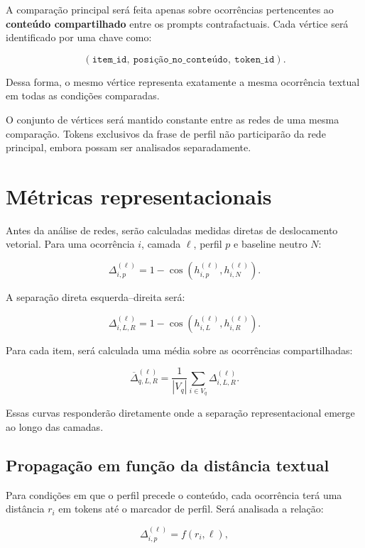 \documentclass[11pt,a4paper]{article}
\newcommand{\hstate}[3]{h_{#1,#2}^{(#3)}}
\begin{document}
A comparação principal será feita apenas sobre ocorrências pertencentes ao \textbf{conteúdo compartilhado} entre os prompts contrafactuais. Cada vértice será identificado por uma chave como:

\[
(\texttt{item\_id},\ \texttt{posição\_no\_conteúdo},\ \texttt{token\_id}).
\]

Dessa forma, o mesmo vértice representa exatamente a mesma ocorrência textual em todas as condições comparadas.

O conjunto de vértices será mantido constante entre as redes de uma mesma comparação. Tokens exclusivos da frase de perfil não participarão da rede principal, embora possam ser analisados separadamente.

\section{Métricas representacionais}

Antes da análise de redes, serão calculadas medidas diretas de deslocamento vetorial. Para uma ocorrência $i$, camada $\ell$, perfil $p$ e baseline neutro $N$:

\[
\Delta_{i,p}^{(\ell)}
=
1-\cos\left(
\hstate{i}{p}{\ell},
\hstate{i}{N}{\ell}
\right).
\]

A separação direta esquerda--direita será:

\[
\Delta_{i,L,R}^{(\ell)}
=
1-\cos\left(
\hstate{i}{L}{\ell},
\hstate{i}{R}{\ell}
\right).
\]

Para cada item, será calculada uma média sobre as ocorrências compartilhadas:

\[
\overline{\Delta}_{q,L,R}^{(\ell)}
=
\frac{1}{|V_q|}
\sum_{i \in V_q}
\Delta_{i,L,R}^{(\ell)}.
\]

Essas curvas responderão diretamente onde a separação representacional emerge ao longo das camadas.

\subsection{Propagação em função da distância textual}

Para condições em que o perfil precede o conteúdo, cada ocorrência terá uma distância $r_i$ em tokens até o marcador de perfil. Será analisada a relação:

\[
\Delta_{i,p}^{(\ell)} = f(r_i,\ell),
\]
\end{document}
